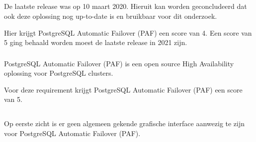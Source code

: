 \subsection{}
\label{subsec:Should have}



\subsubsection{}
\label{subsubsec:Actieve ondersteuning in 2020-2021}

De laatste release was op 10 maart 2020. Hieruit kan worden geconcludeerd dat ook deze oplossing nog up-to-date is en bruikbaar voor dit onderzoek. 

Hier krijgt PostgreSQL Automatic Failover (PAF) een score van 4. Een score van 5 ging behaald worden moest de laatste release in 2021 zijn.

\subsubsection{}
\label{subsubsec:Open source}

PostgreSQL Automatic Failover (PAF) is een open source High Availability oplossing voor PostgreSQL clusters.

Voor deze requirement krijgt PostgreSQL Automatic Failover (PAF) een score van 5.

\subsection{}
\label{subsec:Could have}

\subsubsection{}
\label{subsubsec:Grafische interface}

Op eerste zicht is er geen algemeen gekende grafische interface aanwezig te zijn voor PostgreSQL Automatic Failover (PAF).

\subsubsection{}
\label{subsubsec:Beperkte manuele interventie}

